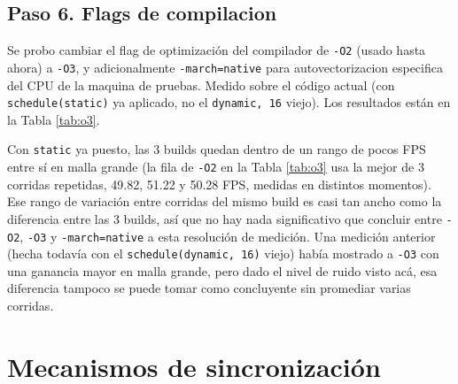 \documentclass[11pt]{article}
\begin{document}
\subsection{Paso 6. Flags de compilacion}

Se probo cambiar el flag de optimización del compilador de \texttt{-O2}
(usado hasta ahora) a \texttt{-O3}, y adicionalmente \texttt{-march=native}
para autovectorizacion especifica del CPU de la maquina de pruebas.
Medido sobre el código actual (con \texttt{schedule(static)} ya
aplicado, no el \texttt{dynamic, 16} viejo). Los resultados están en la
Tabla \ref{tab:o3}.

Con \texttt{static} ya puesto, las 3 builds quedan dentro de un rango de
pocos FPS entre sí en malla grande (la fila de \texttt{-O2} en la Tabla
\ref{tab:o3} usa la mejor de 3 corridas repetidas, 49.82, 51.22 y 50.28
FPS, medidas en distintos momentos). Ese rango de variación entre
corridas del mismo build es casi tan ancho como la diferencia entre las
3 builds, así que no hay nada significativo que concluir entre
\texttt{-O2}, \texttt{-O3} y \texttt{-march=native} a esta resolución de
medición. Una medición anterior (hecha todavía con el
\texttt{schedule(dynamic, 16)} viejo) había mostrado a \texttt{-O3} con
una ganancia mayor en malla grande, pero dado el nivel de ruido visto
acá, esa diferencia tampoco se puede tomar como concluyente sin
promediar varias corridas.

\newpage

\section{Mecanismos de sincronización}
\end{document}
